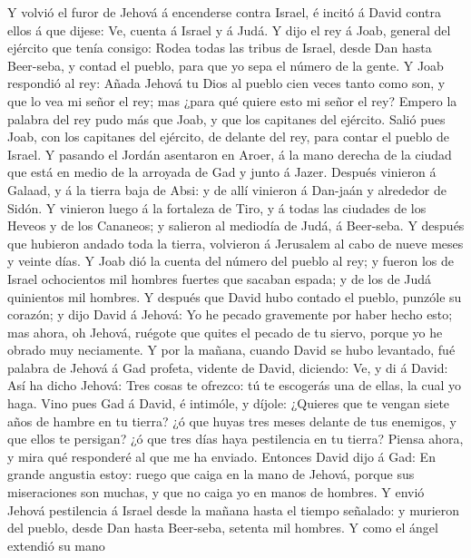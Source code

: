  Y volvió el furor de Jehová á encenderse contra Israel, é
incitó á David contra ellos á que dijese: Ve, cuenta á Israel y á Judá.
 Y dijo el rey á Joab, general del ejército que tenía
consigo: Rodea todas las tribus de Israel, desde Dan hasta Beer-seba, y
contad el pueblo, para que yo sepa el número de la gente.  Y
Joab respondió al rey: Añada Jehová tu Dios al pueblo cien veces tanto
como son, y que lo vea mi señor el rey; mas ¿para qué quiere esto mi
señor el rey?  Empero la palabra del rey pudo más que Joab,
y que los capitanes del ejército. Salió pues Joab, con los capitanes del
ejército, de delante del rey, para contar el pueblo de Israel.
 Y pasando el Jordán asentaron en Aroer, á la mano derecha
de la ciudad que está en medio de la arroyada de Gad y junto á Jazer.
 Después vinieron á Galaad, y á la tierra baja de Absi: y de
allí vinieron á Dan-jaán y alrededor de Sidón.  Y vinieron
luego á la fortaleza de Tiro, y á todas las ciudades de los Heveos y de
los Cananeos; y salieron al mediodía de Judá, á Beer-seba. 
Y después que hubieron andado toda la tierra, volvieron á Jerusalem al
cabo de nueve meses y veinte días.  Y Joab dió la cuenta del
número del pueblo al rey; y fueron los de Israel ochocientos mil hombres
fuertes que sacaban espada; y de los de Judá quinientos mil hombres.
 Y después que David hubo contado el pueblo, punzóle su
corazón; y dijo David á Jehová: Yo he pecado gravemente por haber hecho
esto; mas ahora, oh Jehová, ruégote que quites el pecado de tu siervo,
porque yo he obrado muy neciamente.  Y por la mañana,
cuando David se hubo levantado, fué palabra de Jehová á Gad profeta,
vidente de David, diciendo:  Ve, y di á David: Así ha dicho
Jehová: Tres cosas te ofrezco: tú te escogerás una de ellas, la cual yo
haga.  Vino pues Gad á David, é intimóle, y díjole:
¿Quieres que te vengan siete años de hambre en tu tierra? ¿ó que huyas
tres meses delante de tus enemigos, y que ellos te persigan? ¿ó que tres
días haya pestilencia en tu tierra? Piensa ahora, y mira qué responderé
al que me ha enviado.  Entonces David dijo á Gad: En grande
angustia estoy: ruego que caiga en la mano de Jehová, porque sus
miseraciones son muchas, y que no caiga yo en manos de hombres.
 Y envió Jehová pestilencia á Israel desde la mañana hasta
el tiempo señalado: y murieron del pueblo, desde Dan hasta Beer-seba,
setenta mil hombres.  Y como el ángel extendió su mano
